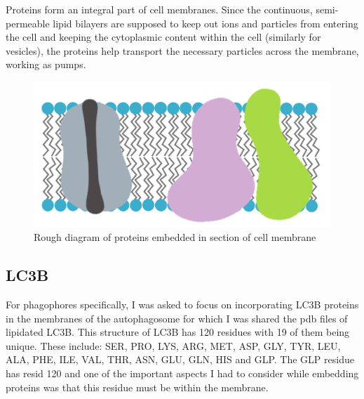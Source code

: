 \documentclass[12pt, a4paper]{report}
\begin{document}
Proteins form an integral part of cell membranes. Since the continuous, semi-permeable lipid bilayers are supposed to keep out ions and particles from entering the cell and keeping the cytoplasmic content within the cell (similarly for vesicles), the proteins help transport the necessary particles across the membrane, working as pumps.  

\begin{figure}[h]
    \includegraphics[scale=0.55]{images/proteins embeddings.png} 
    \centering 
    \caption{Rough diagram of proteins embedded in section of cell membrane}
    \centering
\end{figure} 

\subsection*{LC3B} 

For phagophores specifically, I was asked to focus on incorporating LC3B proteins in the membranes of the autophagosome for which I was shared the pdb files of lipidated LC3B. This structure of LC3B has 120 residues with 19 of them being unique. These include: SER, PRO, LYS, ARG, MET, ASP, GLY, TYR, LEU, ALA, PHE, ILE, VAL, THR, ASN, GLU, GLN, HIS and GLP. The GLP residue has resid 120 and one of the important aspects I had to consider while embedding proteins was that this residue must be within the membrane. 
\end{document}
